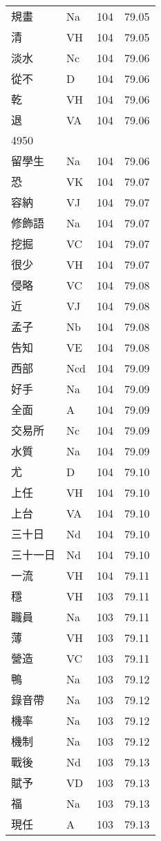\documentclass[twocolumn]{book}
\begin{document}
\begin{supertabular}{llrr}
規畫 & Na & 104 &  79.05\\
清 & VH & 104 &  79.05\\
淡水 & Nc & 104 &  79.06\\
從不 & D & 104 &  79.06\\
乾 & VH & 104 &  79.06\\
退 & VA & 104 &  79.06\\
4950\\
留學生 & Na & 104 &  79.06\\
恐 & VK & 104 &  79.07\\
容納 & VJ & 104 &  79.07\\
修飾語 & Na & 104 &  79.07\\
挖掘 & VC & 104 &  79.07\\
很少 & VH & 104 &  79.07\\
侵略 & VC & 104 &  79.08\\
近 & VJ & 104 &  79.08\\
孟子 & Nb & 104 &  79.08\\
告知 & VE & 104 &  79.08\\
西部 & Ncd & 104 &  79.09\\
好手 & Na & 104 &  79.09\\
全面 & A & 104 &  79.09\\
交易所 & Nc & 104 &  79.09\\
水質 & Na & 104 &  79.09\\
尤 & D & 104 &  79.10\\
上任 & VH & 104 &  79.10\\
上台 & VA & 104 &  79.10\\
三十日 & Nd & 104 &  79.10\\
三十一日 & Nd & 104 &  79.10\\
一流 & VH & 104 &  79.11\\
穩 & VH & 103 &  79.11\\
職員 & Na & 103 &  79.11\\
薄 & VH & 103 &  79.11\\
營造 & VC & 103 &  79.11\\
鴨 & Na & 103 &  79.12\\
錄音帶 & Na & 103 &  79.12\\
機率 & Na & 103 &  79.12\\
機制 & Na & 103 &  79.12\\
戰後 & Nd & 103 &  79.13\\
賦予 & VD & 103 &  79.13\\
福 & Na & 103 &  79.13\\
現任 & A & 103 &  79.13\\

\end{supertabular}
\end{document}
